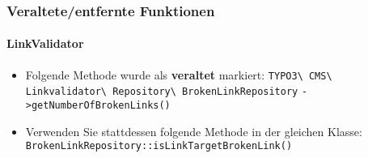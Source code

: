 %
%
%
%
%
%
%
%
%

\begin{frame}[fragile]
	\frametitle{Veraltete/entfernte Funktionen}
	\framesubtitle{LinkValidator}

	\begin{itemize}
		\item Folgende Methode wurde als \textbf{veraltet} markiert:
		\newline\newline
			\smaller
				\texttt{TYPO3\textbackslash
					CMS\textbackslash
					Linkvalidator\textbackslash
					Repository\textbackslash
					BrokenLinkRepository}\newline
				\texttt{->getNumberOfBrokenLinks()}\normalsize\newline

		\item Verwenden Sie stattdessen folgende Methode in der gleichen Klasse:\newline
			\small\texttt{BrokenLinkRepository::isLinkTargetBrokenLink()}\normalsize

	\end{itemize}

\end{frame}


